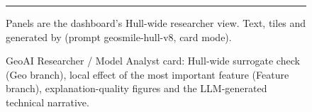 \begin{figure}[!htbp]
\begin{tcolorbox}
\noindent\cardTileA\hfill\cardTileB\hfill\cardTileC\hfill\cardTileD\par\vspace{4pt}
{\color{cardRule}\rule{\linewidth}{0.4pt}}\par\vspace{1pt}
{\color{cardMuted}\footnotesize \cardFooter{} Panels are the dashboard's Hull-wide researcher view.
Text, tiles and  generated by \cardModel{} (prompt geosmile-hull-v8, card
mode).\par}
\end{tcolorbox}
\caption{GeoAI Researcher / Model Analyst card: Hull-wide surrogate check (Geo branch), local
effect of the most important feature (Feature branch), explanation-quality figures and the
LLM-generated technical narrative.}
\label{fig:stakeholder-researcher}
\end{figure}
